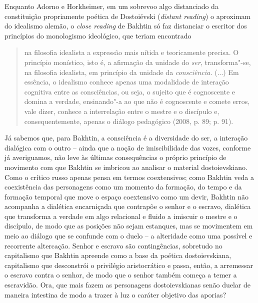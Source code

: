 {{Enquanto Adorno e Horkheimer, em um sobrevoo algo distanciado da
constituição propriamente poética de Dostoiévski (\emph{distant
reading}) o aproximam do idealismo alemão, o \emph{close reading} de
Bakhtin só faz distanciar o escritor dos princípios do monologismo
ideológico, que teriam encontrado

\begin{quote}
na filosofia idealista a expressão mais nítida e teoricamente precisa. O
princípio monístico, isto é, a afirmação da unidade do \emph{ser},
transforma"-se, na filosofia idealista, em princípio da unidade da
\emph{consciência.} (...) Em essência, o idealismo conhece apenas uma
modalidade de interação cognitiva entre as consciências, ou seja, o
sujeito que é cognoscente e domina a verdade, ensinando"-a ao que não é
cognoscente e comete erros, vale dizer, conhece a interrelação entre o
mestre e o discípulo e, consequentemente, apenas o diálogo pedagógico
(2008, p. 89; p. 91).
\end{quote}

Já sabemos que, para Bakhtin, a consciência é a diversidade do ser, a
interação dialógica com o outro -- ainda que a noção de imiscibilidade
das vozes, conforme já averiguamos, não leve às últimas consequências o
próprio princípio de movimento com que Bakhtin se imbricou ao analisar o
material dostoievskiano. Como o crítico russo apenas pensa em termos
coextensivos; como Bakhtin veda a coexistência das personagens como um
momento da formação, do tempo e da formação temporal que move o espaço
coextensivo como um devir, Bakhtin não acompanha a dialética encarniçada
que contrapõe o senhor e o escravo, dialética que transforma a verdade
em algo relacional e fluido a imiscuir o mestre e o discípulo, de modo
que as posições não sejam estanques, mas se movimentem em meio ao
diálogo que se confunde com o duelo -- a alteridade como uma possível e
recorrente altercação. Senhor e escravo são contingências, sobretudo no
capitalismo que Bakhtin apreende como a base da poética dostoievskiana,
capitalismo que desconstrói o privilégio aristocrático e passa, então, a
arremessar o escravo contra o senhor, de modo que o senhor também começa
a temer a escravidão. Ora, que mais fazem as personagens dostoievskianas
senão duelar de maneira intestina de modo a trazer à luz o caráter
objetivo das aporias?

}}
